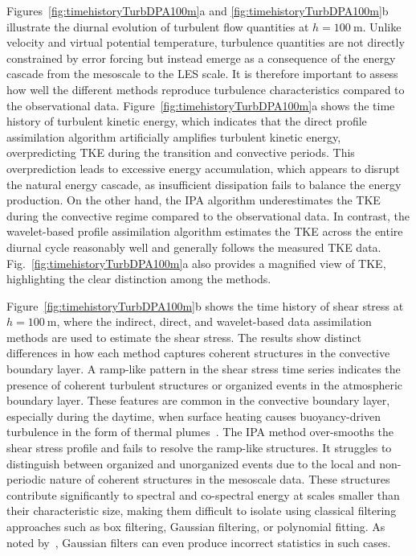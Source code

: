 Figures~\ref{fig:timehistoryTurbDPA100m}a and \ref{fig:timehistoryTurbDPA100m}b illustrate the diurnal evolution of turbulent flow quantities at $h=100~\mathrm{m}$. Unlike velocity and virtual potential temperature, turbulence quantities are not directly constrained by error forcing but instead emerge as a consequence of the energy cascade from the mesoscale to the LES scale. It is therefore important to assess how well the different methods reproduce turbulence characteristics compared to the observational data. Figure~\ref{fig:timehistoryTurbDPA100m}a shows the time history of turbulent kinetic energy, which indicates that the direct profile assimilation algorithm artificially amplifies turbulent kinetic energy, overpredicting TKE during the transition and convective periods. This overprediction leads to excessive energy accumulation, which appears to disrupt the natural energy cascade, as insufficient dissipation fails to balance the energy production. On the other hand, the IPA algorithm underestimates the TKE during the convective regime compared to the observational data. In contrast, the wavelet-based profile assimilation algorithm estimates the TKE across the entire diurnal cycle reasonably well and generally follows the measured TKE data. Fig.~\ref{fig:timehistoryTurbDPA100m}a also provides a magnified view of TKE, highlighting the clear distinction among the methods.

Figure~\ref{fig:timehistoryTurbDPA100m}b shows the time history of shear stress at \( h = 100~\mathrm{m} \), where the indirect, direct, and wavelet-based data assimilation methods are used to estimate the shear stress. The results show distinct differences in how each method captures coherent structures in the convective boundary layer. A ramp-like pattern in the shear stress time series indicates the presence of coherent turbulent structures or organized events in the atmospheric boundary layer. These features are common in the convective boundary layer, especially during the daytime, when surface heating causes buoyancy-driven turbulence in the form of thermal plumes~\citep{gao1989observation,Paw1992,vidakovic2009statistical,li2011coherent}. The IPA method over-smooths the shear stress profile and fails to resolve the ramp-like structures. It struggles to distinguish between organized and unorganized events due to the local and non-periodic nature of coherent structures in the mesoscale data. These structures contribute significantly to spectral and co-spectral energy at scales smaller than their characteristic size, making them difficult to isolate using classical filtering approaches such as box filtering, Gaussian filtering, or polynomial fitting. As noted by~\citet{allaerts2020development}, Gaussian filters can even produce incorrect statistics in such cases.

